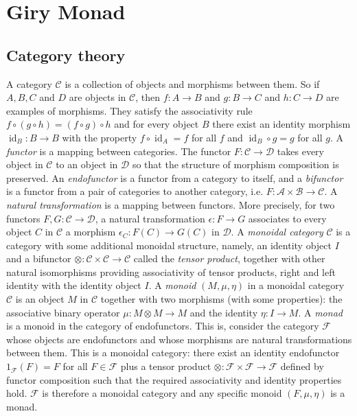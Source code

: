 
\section{Giry Monad}

\subsection{Category theory}
A category $\mathcal{C}$ is a collection of objects and morphisms between them. So if $A,B,C$ and $D$ are objects in $\mathcal{C}$, then $f : A \to B$ and $g : B \to C$ and $h : C \to D$ are examples of morphisms. They satisfy the associativity rule $f \circ (g \circ h) = (f \circ g) \circ h$ and for every object $B$ there exist an identity morphism $\operatorname{id}_B : B \to B$ with the property $f \circ \operatorname{id}_A = f$ for all $f$ and $\operatorname{id}_B \circ g = g$ for all $g$. A \emph{functor} is a mapping between categories. The functor $F : \mathcal{C} \to \mathcal{D}$ takes every object in $\mathcal{C}$ to an object in $\mathcal{D}$ so that the structure of morphism composition is preserved. An \emph{endofunctor} is a functor from a category to itself, and a \emph{bifunctor} is a functor from a pair of categories to another category, i.e. $F : \mathcal{A} \times \mathcal{B} \to \mathcal{C}$. A \emph{natural transformation } is a mapping between functors. More precisely, for two functors $F,G : \mathcal{C} \to \mathcal{D}$, a natural transformation $\epsilon : F \to G$ associates to every object $C$ in $\mathcal{C}$ a morphism $\epsilon_C : F(C) \to G(C)$ in $\mathcal{D}$. A \emph{monoidal category} $\mathcal{C}$ is a category with some additional monoidal structure, namely, an identity object $I$ and a bifunctor $\otimes : \mathcal{C} \times \mathcal{C} \to \mathcal{C}$ called the \emph{tensor product}, together with other natural isomorphisms providing associativity of tensor products, right and left identity with the identity object $I$. A \emph{monoid} $(M,\mu,\eta)$ in a monoidal category $\mathcal{C}$ is an object $M$ in $\mathcal{C}$ together with two morphisms (with some properties): the associative binary operator $\mu : M \otimes M \to M$ and the identity $\eta : I \to M$. A \emph{monad} is a monoid in the category of endofunctors. This is, consider the category $\mathcal{F}$ whose objects are endofunctors and whose morphisms are natural transformations between them. This is a monoidal category: there exist an identity endofunctor $1_{\mathcal{F}}(F)=F$ for all $F \in \mathcal{F}$ plus a tensor product $\otimes : \mathcal{F} \times \mathcal{F} \to \mathcal{F}$ defined by functor composition such that the required associativity and identity properties hold. $\mathcal{F}$ is therefore a monoidal category and any specific monoid $(F,\mu,\eta)$ is a monad.
